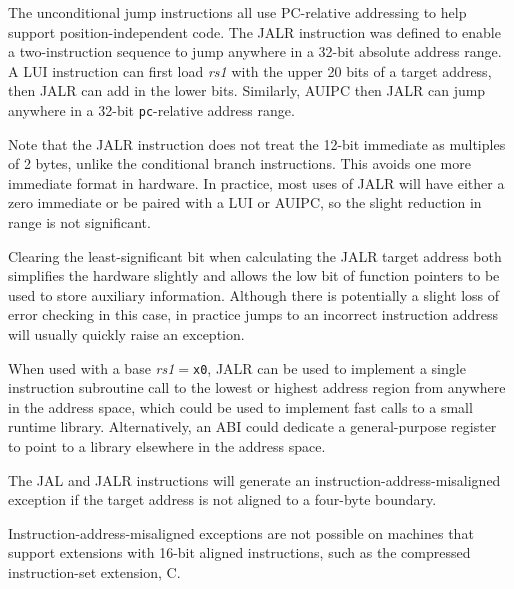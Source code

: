 \begin{commentary}
The unconditional jump instructions all use PC-relative addressing to
help support position-independent code.  The JALR instruction was
defined to enable a two-instruction sequence to jump anywhere in a
32-bit absolute address range.  A LUI instruction can first load {\em
  rs1} with the upper 20 bits of a target address, then JALR can add
in the lower bits. Similarly, AUIPC then JALR can jump
anywhere in a 32-bit {\tt pc}-relative address range.

Note that the JALR instruction does not treat the 12-bit immediate as
multiples of 2 bytes, unlike the conditional branch instructions.
This avoids one more immediate format in hardware.  In
practice, most uses of JALR will have either a zero immediate or be
paired with a LUI or AUIPC, so the slight reduction in range is not
significant.

Clearing the least-significant bit when calculating the JALR target
address both simplifies the hardware slightly and allows the
low bit of function pointers to be used to store auxiliary
information.  Although there is potentially a slight loss of error
checking in this case, in practice jumps to an incorrect instruction
address will usually quickly raise an exception.

When used with a base {\em rs1}$=${\tt x0}, JALR can be used to implement
a single instruction subroutine call to the lowest  or highest
 address region from anywhere in the address space, which could
be used to implement fast calls to a small runtime library.  Alternatively,
an ABI could dedicate a general-purpose register to point to a library
elsewhere in the address space.
\end{commentary}

\begin{formalspec}
  \sailfclRISCVUnderscoreJALexecute
  \sailfclRISCVUnderscoreJALRexecute
\end{formalspec}


The JAL and JALR instructions will generate an
instruction-address-misaligned exception if the target address is not
aligned to a four-byte boundary.

\begin{commentary}
Instruction-address-misaligned exceptions are not possible on machines
that support extensions with 16-bit aligned instructions, such as the
compressed instruction-set extension, C.
\end{commentary}

